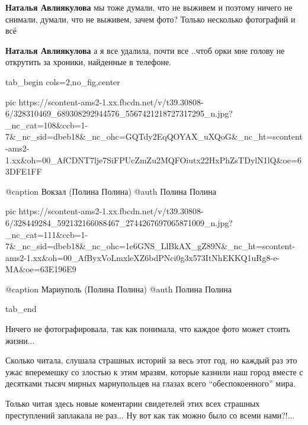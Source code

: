 \begin{itemize} %
\textbf{Наталья Авлиякулова} мы тоже думали, что не выживем и поэтому ничего не снимали, думали, что не выживем, зачем фото? Только несколько фотографий и всё

\textbf{Наталья Авлиякулова} а я все удалила, почти все ..чтоб орки мне голову не открутить за хроники, найденные в телефоне.
\end{itemize} %


\ifcmt
  tab_begin cols=2,no_fig,center

     pic https://scontent-ams2-1.xx.fbcdn.net/v/t39.30808-6/328310469_689308292944576_5567421218727317295_n.jpg?_nc_cat=108&ccb=1-7&_nc_sid=dbeb18&_nc_ohc=GQTdy2EqQOYAX_uXQoG&_nc_ht=scontent-ams2-1.xx&oh=00_AfCDNT7lje7SiFPUcZmZu2MQFOiutx22HxPhZsTDylN1lQ&oe=63DFE1FF

     @caption Вокзал (Полина Полина)
     @auth Полина Полина

     pic https://scontent-ams2-1.xx.fbcdn.net/v/t39.30808-6/328449284_592132166088467_2744267697065871009_n.jpg?_nc_cat=111&ccb=1-7&_nc_sid=dbeb18&_nc_ohc=1e6GNS_LlBkAX_gZ89N&_nc_ht=scontent-ams2-1.xx&oh=00_AfByxVoLmxleXZ6bdPNci0g3x573ItNhEKKQ1uRg8-e-MA&oe=63E196E9

     @caption Мариуполь (Полина Полина)
     @auth Полина Полина

  tab_end
\fi


Ничего не фотографировала, так как понимала, что каждое фото может стоить жизни...


Сколько читала, слушала страшных историй за весь этот год, но каждый раз это
ужас вперемешку со злостью к этим мразям, которые казнили наш город вместе с
десятками тысяч мирных мариупольцев на глазах всего \enquote{обеспокоенного} мира.

Только читая здесь новые коментарии свидетелей этих всех страшных преступлений
заплакала не раз... Ну вот как так можно было со всеми нами?!...

